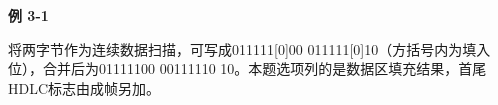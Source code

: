 {\color{ink}\bfseries 例 3-1}\par\vspace{1bp}将两字节作为连续数据扫描，可写成011111[0]00 011111[0]10（方括号内为填入位），合并后为01111100 00111110 10。本题选项列的是数据区填充结果，首尾HDLC标志由成帧另加。
